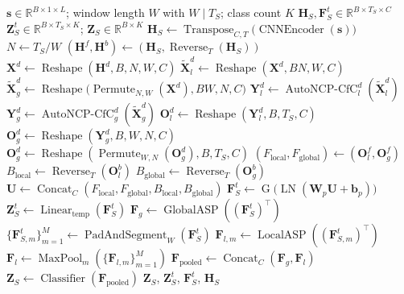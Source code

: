 ﻿\documentclass[lettersize,journal]{IEEEtran}
\begin{document}
\begin{algorithm}[!t]
\caption{BiTAL Student Network for Underwater Acoustic Recognition}
\label{alg:student_network}
\begin{algorithmic}[1]
\Require $\mathbf{s}\in\mathbb{R}^{B\times 1\times L}$; window length $W$ with $W\mid T_S$; class count $K$
\Ensure $\mathbf{H}_S,\mathbf{F}_S^t\in\mathbb{R}^{B\times T_S\times C}$
\Ensure $\mathbf{Z}_S^t\in\mathbb{R}^{B\times T_S\times K}$; $\mathbf{Z}_S\in\mathbb{R}^{B\times K}$
\State $\mathbf{H}_S \gets \operatorname{Transpose}_{C,T}\big(\operatorname{CNNEncoder}(\mathbf{s})\big)$
\State $N \gets T_S/W$
\State $(\mathbf{H}^{f},\mathbf{H}^{b}) \gets (\mathbf{H}_S,\operatorname{Reverse}_{T}(\mathbf{H}_S))$
 
    \State $\mathbf{X}^{d} \gets \operatorname{Reshape}(\mathbf{H}^{d},B,N,W,C)$
    \State $\tilde{\mathbf{X}}_{l}^{d} \gets \operatorname{Reshape}(\mathbf{X}^{d},B N,W,C)$
    \State $\tilde{\mathbf{X}}_{g}^{d} \gets \operatorname{Reshape}\big(\operatorname{Permute}_{N,W}(\mathbf{X}^{d}),B W,N,C\big)$
    \State $\mathbf{Y}_{l}^{d} \gets \operatorname{AutoNCP\mbox{-}CfC}_{l}^{d}(\tilde{\mathbf{X}}_{l}^{d})$ 
    \State $\mathbf{Y}_{g}^{d} \gets \operatorname{AutoNCP\mbox{-}CfC}_{g}^{d}(\tilde{\mathbf{X}}_{g}^{d})$
    \State $\mathbf{O}_{l}^{d} \gets \operatorname{Reshape}(\mathbf{Y}_{l}^{d},B,T_S,C)$
    \State $\mathbf{O}_{g}^{d} \gets \operatorname{Reshape}(\mathbf{Y}_{g}^{d},B,W,N,C)$
    \State $\mathbf{O}_{g}^{d} \gets \operatorname{Reshape}(\operatorname{Permute}_{W,N}(\mathbf{O}_{g}^{d}),B,T_S,C)$
\EndFor
\State $(F_{\mathrm{local}},F_{\mathrm{global}}) \gets (\mathbf{O}_{l}^{f},\mathbf{O}_{g}^{f})$
\State $B_{\mathrm{local}} \gets \operatorname{Reverse}_{T}(\mathbf{O}_{l}^{b})$
\State $B_{\mathrm{global}} \gets \operatorname{Reverse}_{T}(\mathbf{O}_{g}^{b})$
\State $\mathbf{U} \gets \operatorname{Concat}_{C}(F_{\mathrm{local}},F_{\mathrm{global}},B_{\mathrm{local}},B_{\mathrm{global}})$
\State $\mathbf{F}_S^t \gets \operatorname{G}\big(\operatorname{LN}(\mathbf{W}_{p}\mathbf{U}+\mathbf{b}_{p})\big)$
\State $\mathbf{Z}_S^t \gets \operatorname{Linear}_{\mathrm{temp}}(\mathbf{F}_S^t)$ 
\State $\mathbf{F}_g \gets \operatorname{GlobalASP}((\mathbf{F}_S^t)^\top)$
\State $\{\mathbf{F}_{S,m}^t\}_{m=1}^{M} \gets \operatorname{PadAndSegment}_{W}(\mathbf{F}_S^t)$
    \State $\mathbf{F}_{l,m} \gets \operatorname{LocalASP}((\mathbf{F}_{S,m}^t)^\top)$ 
\EndFor
\State $\mathbf{F}_l \gets \operatorname{MaxPool}_{m}(\{\mathbf{F}_{l,m}\}_{m=1}^{M})$
\State $\mathbf{F}_{\mathrm{pooled}} \gets \operatorname{Concat}_{C}(\mathbf{F}_g,\mathbf{F}_l)$
\State $\mathbf{Z}_S \gets \operatorname{Classifier}(\mathbf{F}_{\mathrm{pooled}})$
\State \Return $\mathbf{Z}_S$, $\mathbf{Z}_S^t$, $\mathbf{F}_S^t$, $\mathbf{H}_S$ 
\end{algorithmic}
\end{algorithm}
\end{document}
